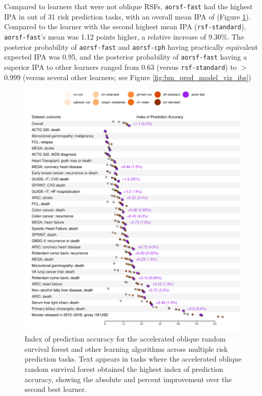 \documentclass[twoside,11pt]{article}\usepackage[]{graphicx}\usepackage[]{xcolor}
\makeatletter
\def\maxwidth{ %
  \ifdim\Gin@nat@width>\linewidth
    \linewidth
  \else
    \Gin@nat@width
  \fi
}
\newenvironment{knitrout}{}{} %
\makeatother
\begin{document}
Compared to learners that were not oblique RSFs, \texttt{aorsf-fast} had the highest IPA in  out of 31 risk prediction tasks, with an overall mean IPA of  (Figure \ref{fig:bm_pred_viz_ibs}). Compared to the learner with the second highest mean IPA (\texttt{rsf-standard}), \texttt{aorsf-fast}'s mean was 1.12 points higher, a relative increase of 9.30\%. The posterior probability of \texttt{aorsf-fast} and \texttt{aorsf-cph} having practically equivalent expected IPA was 0.95, and the posterior probability of \texttt{aorsf-fast} having a superior IPA to other learners ranged from 0.63 (versus \texttt{rsf-standard}) to $>$0.999 (versus several other learners; see Figure \ref{fig:bm_pred_model_viz_ibs})

\begin{knitrout}
\color{fgcolor}\begin{figure}
\includegraphics[width=\maxwidth]{figure/bm_pred_viz_ibs-1} \caption[Index of prediction accuracy for the accelerated oblique random survival forest and other learning algorithms across multiple risk prediction tasks]{Index of prediction accuracy for the accelerated oblique random survival forest and other learning algorithms across multiple risk prediction tasks. Text appears in tasks where the accelerated oblique random survival forest obtained the highest index of prediction accuracy, showing the absolute and percent improvement over the second best learner.}\label{fig:bm_pred_viz_ibs}
\end{figure}

\end{knitrout}
\end{document}
